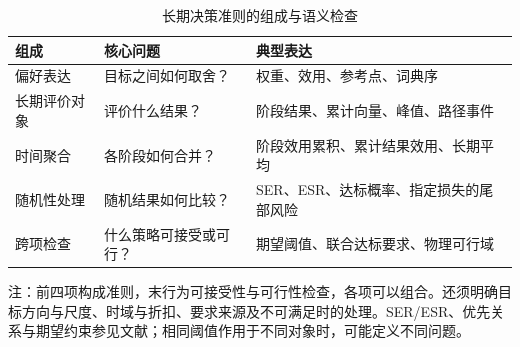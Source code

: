 \begin{table}[H]
\centering
\caption{长期决策准则的组成与语义检查}
\label{tab:criterion-definition}
\begingroup
{}\songti
\setlength{\tabcolsep}{6pt}
\renewcommand{\arraystretch}{1.18}
\begin{tabularx}{\textwidth}{@{}P{0.17\textwidth}Y Y@{}}
\toprule
组成 & 核心问题 & 典型表达 \\
\midrule
偏好表达 & 目标之间如何取舍？ & 权重、效用、参考点、词典序 \\
\addlinespace[4pt]
长期评价对象 & 评价什么结果？ & 阶段结果、累计向量、峰值、路径事件 \\
\addlinespace[4pt]
时间聚合 & 各阶段如何合并？ & 阶段效用累积、累计结果效用、长期平均 \\
\addlinespace[4pt]
随机性处理 & 随机结果如何比较？ & SER、ESR、达标概率、指定损失的尾部风险 \\
\midrule
跨项检查 & 什么策略可接受或可行？ & 期望阈值、联合达标要求、物理可行域 \\
\bottomrule
\end{tabularx}
\par\vspace{4pt}\raggedright\noindent
注：前四项构成准则，末行为可接受性与可行性检查，各项可以组合。还须明确目标方向与尺度、时域与折扣、要求来源及不可满足时的处理。SER/ESR、优先关系与期望约束参见文献\cite{hayes2022,skalse2022,achiam2017}；相同阈值作用于不同对象时，可能定义不同问题。
\par\endgroup
\end{table}
